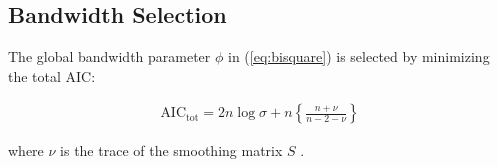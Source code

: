 \documentclass[authoryear, review, 11pt]{elsarticle}
\begin{document}
	\subsection{Bandwidth Selection}
	The global bandwidth parameter $\phi$ in (\ref{eq:bisquare}) is selected by minimizing the total AIC:
	
	\begin{align}
		\text{AIC}_{\text{tot}} = 2 n \log{\sigma} + n \left\{\frac{n + \nu}{n - 2 - \nu}\right\}
	\end{align}
	
	where $\nu$ is the trace of the smoothing matrix $S$ \citep{Hurvich:1998}.
	
	
	
\end{document}

